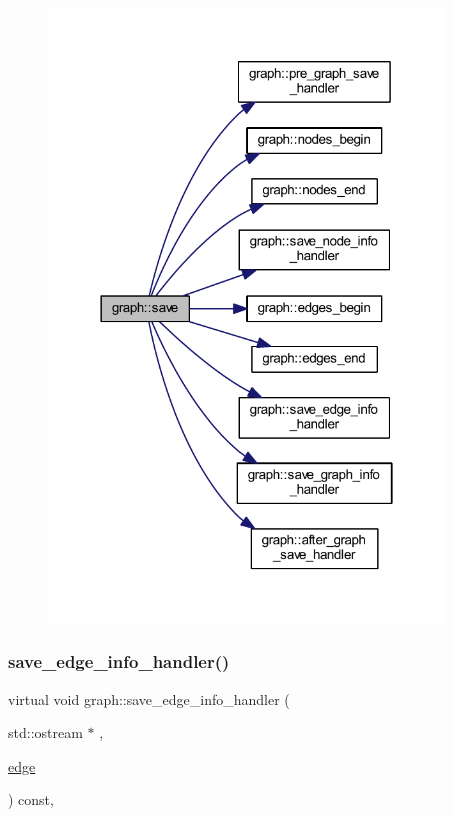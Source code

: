 \nopagebreak
\begin{figure}[H]
\begin{center}
\leavevmode
\includegraphics[width=298pt]{classgraph_ad53bd0f3c96616b7f2d44abdce3df6de_cgraph}
\end{center}
\end{figure}
\mbox{\label{classgraph_a37bb8d0951691e37cdfb271229960f9c}} 
\subsubsection{\texorpdfstring{save\+\_\+edge\+\_\+info\+\_\+handler()}{save\_edge\_info\_handler()}}
{\footnotesize\ttfamily virtual void graph\+::save\+\_\+edge\+\_\+info\+\_\+handler (\begin{DoxyParamCaption}\item[{std\+::ostream $\ast$}]{,  }\item[{\mbox{\hyperlink{classedge}{edge}}}]{ }\end{DoxyParamCaption}) const\hspace{0.3cm}{\ttfamily [inline]}, {\ttfamily [virtual]}}

